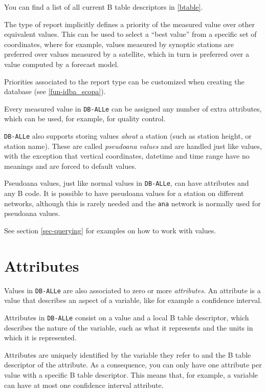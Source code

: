 \documentclass[final,12pt,a4paper,twoside]{book}
\newcommand{\dballe}{{\tt DB-ALLe}}
\begin{document}
You can find a list of all current B table descriptors in \ref{btable}.

The type of report implicitly defines a priority of the measured value over
other equivalent values.  This can be used to select a ``best value'' from a
specific set of coordinates, where for example, values measured by synoptic
stations are preferred over values measured by a satellite, which in turn is
preferred over a value computed by a forecast model.

Priorities associated to the report type can be customized when creating the
database (see \ref{fun-idba_scopa}).

Every measured value in \dballe{} can be assigned any number of extra
attributes, which can be used, for example, for quality control.

\dballe{} also supports storing values \emph{about} a station (such as station
height, or station name).  These are called \emph{pseudoana values} and are
handled just like values, with the exception that vertical coordinates,
datetime and time range have no meanings and are forced to default values.

Pseudoana values, just like normal values in \dballe{}, can have attributes and
any B code.  It is possible to have pseudoana values for a station on different
networks, although this is rarely needed and the {\tt ana} network is normally
used for pseudoana values.

See section \ref{sec-querying} for examples on how to work with values.

\section {Attributes}

Values in \dballe{} are also associated to zero or more \emph{attributes}.  An
attribute is a value that describes an aspect of a variable, like for example a
confidence interval.

Attributes in \dballe{} consist on a value and a local B table descriptor,
which describes the nature of the variable, such as what it represents and the
units in which it is represented.

Attributes are uniquely identified by the variable they refer to and the B
table descriptor of the attribute.  As a consequence, you can only have one
attribute per value with a specific B table descriptor.  This means that, for
example, a variable can have at most one confidence interval attribute.
\end{document}
